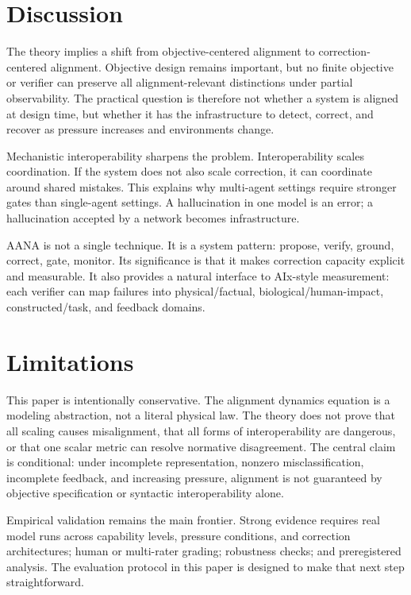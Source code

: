 \documentclass[11pt]{article}
\begin{document}
\section{Discussion}

The theory implies a shift from objective-centered alignment to correction-centered alignment. Objective design remains important, but no finite objective or verifier can preserve all alignment-relevant distinctions under partial observability. The practical question is therefore not whether a system is aligned at design time, but whether it has the infrastructure to detect, correct, and recover as pressure increases and environments change.

Mechanistic interoperability sharpens the problem. Interoperability scales coordination. If the system does not also scale correction, it can coordinate around shared mistakes. This explains why multi-agent settings require stronger gates than single-agent settings. A hallucination in one model is an error; a hallucination accepted by a network becomes infrastructure.

AANA is not a single technique. It is a system pattern: propose, verify, ground, correct, gate, monitor. Its significance is that it makes correction capacity explicit and measurable. It also provides a natural interface to AIx-style measurement: each verifier can map failures into physical/factual, biological/human-impact, constructed/task, and feedback domains.

\section{Limitations}

This paper is intentionally conservative. The alignment dynamics equation is a modeling abstraction, not a literal physical law. The theory does not prove that all scaling causes misalignment, that all forms of interoperability are dangerous, or that one scalar metric can resolve normative disagreement. The central claim is conditional: under incomplete representation, nonzero misclassification, incomplete feedback, and increasing pressure, alignment is not guaranteed by objective specification or syntactic interoperability alone.

Empirical validation remains the main frontier. Strong evidence requires real model runs across capability levels, pressure conditions, and correction architectures; human or multi-rater grading; robustness checks; and preregistered analysis. The evaluation protocol in this paper is designed to make that next step straightforward.
\end{document}
